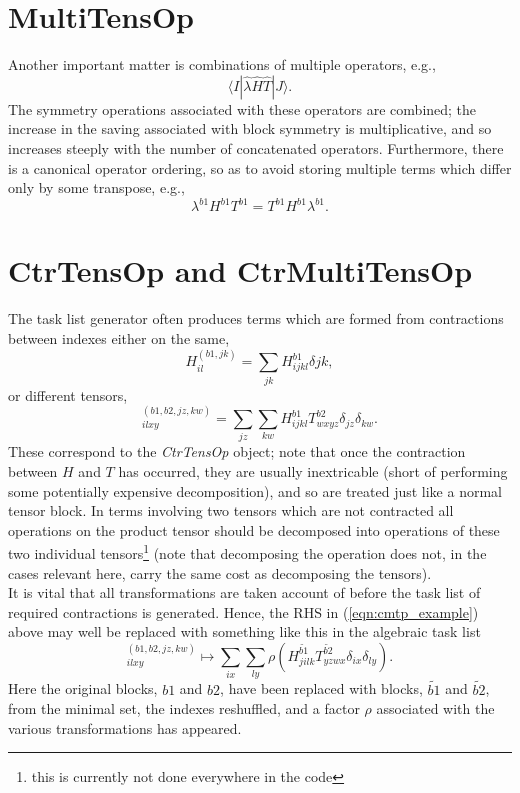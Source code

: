 \section{MultiTensOp } 
\noindent Another important matter is combinations of multiple operators, e.g.,
\begin{equation}
\langle I | \hat{\lambda}\hat{H}\hat{T} | J \rangle .
\end{equation}
The symmetry operations associated with these operators are combined; the increase in the saving
associated with block symmetry is multiplicative, and so increases steeply with
the number of concatenated operators. Furthermore, there is a canonical
operator ordering, so as to avoid storing multiple terms which differ only by some transpose, 
e.g., 
\begin{equation}
\lambda^{b1}H^{b1}T^{b1} = T^{b1}H^{b1}\lambda^{b1}. 
\label{eqn:tens_block_combined}
\end{equation}
\section{CtrTensOp and CtrMultiTensOp}
The task list generator often produces terms which are formed from contractions between indexes either
on the same,
\begin{equation*}
H^{(b1,jk)}_{il} = \sum_{jk} H^{b1}_{ijkl}\delta{jk},
\end{equation*}
or different tensors, 
\begin{equation}
[HT]^{(b1,b2,jz,kw)}_{ilxy} = \sum_{jz} \sum_{kw} H^{b1}_{ijkl}T^{b2}_{wxyz}\delta_{jz}\delta_{kw}.
\label{eqn:cmtp_example}
\end{equation}
These correspond to the \emph{CtrTensOp} object; note that once the contraction between $H$ and $T$ has occurred, they
are usually inextricable (short of performing some potentially expensive decomposition), and so 
are treated just like a normal tensor block. In terms involving two
tensors which are not contracted all operations on the product tensor should be decomposed into operations of these 
two individual tensors\footnote{this is currently not done everywhere in the code} (note that decomposing the
operation does not, in the cases relevant here, carry the same cost as decomposing the tensors).\\

\noindent It is vital that all transformations are taken account of before the task list of required contractions
is generated. Hence, the RHS in (\ref{eqn:cmtp_example}) above may well be replaced with something like this in
the algebraic task list
\begin{equation}
[HT]^{(b1,b2,jz,kw)}_{ilxy} \mapsto \sum_{ix} \sum_{ly} \rho(H^{\tilde{b1}}_{jilk}T^{\tilde{b2}}_{yzwx}\delta_{ix}\delta_{ly}).
\label{eqn:cmtp_example_symm}
\end{equation}
\noindent Here the original blocks,  $b1$ and $b2$, have been replaced with blocks, $\tilde{b1}$ and $\tilde{b2}$,
from the minimal set, the indexes reshuffled, and a factor $\rho$ associated with the various transformations has appeared. 

